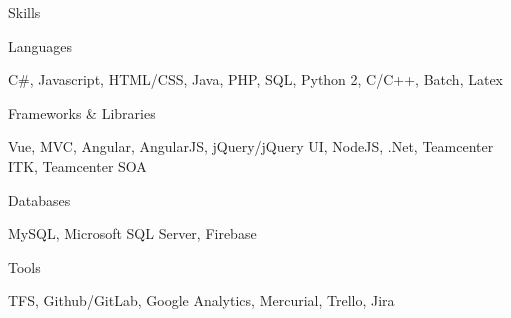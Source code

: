 \documentclass{resume} %
\begin{document}
\begin{rSection}{Skills}

    \begin{rSubsection}{Languages}{}{}{}
        \item C#, Javascript, HTML/CSS, Java, PHP, SQL, Python 2, C/C++, Batch, Latex
    \end{rSubsection}

    \begin{rSubsection}{Frameworks \& Libraries}{}{}{}
        \item Vue, MVC, Angular, AngularJS, jQuery/jQuery UI, NodeJS, .Net, Teamcenter ITK, Teamcenter SOA
    \end{rSubsection}

    \begin{rSubsection}{Databases}{}{}{}
        \item MySQL, Microsoft SQL Server, Firebase
    \end{rSubsection}

    \begin{rSubsection}{Tools}{}{}{}
        \item TFS, Github/GitLab, Google Analytics, Mercurial, Trello, Jira
    \end{rSubsection}
        


\end{rSection}
\end{document}
